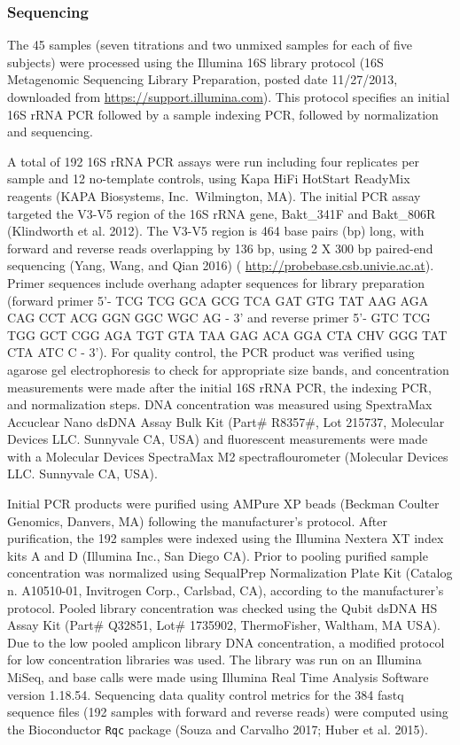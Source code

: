 \documentclass[smallextended]{svjour3}       %
\begin{document}
\hypertarget{sequencing}{%
\subsubsection{Sequencing}\label{sequencing}}

The 45 samples (seven titrations and two unmixed samples for each of
five subjects) were processed using the Illumina 16S library protocol
(16S Metagenomic Sequencing Library Preparation, posted date 11/27/2013,
downloaded from \url{https://support.illumina.com}). This protocol
specifies an initial 16S rRNA PCR followed by a sample indexing PCR,
followed by normalization and sequencing.

A total of 192 16S rRNA PCR assays were run including four replicates
per sample and 12 no-template controls, using Kapa HiFi HotStart
ReadyMix reagents (KAPA Biosystems, Inc.~Wilmington, MA). The initial
PCR assay targeted the V3-V5 region of the 16S rRNA gene, Bakt\_341F and
Bakt\_806R (Klindworth et al. 2012). The V3-V5 region is 464 base pairs
(bp) long, with forward and reverse reads overlapping by 136 bp, using 2
X 300 bp paired-end sequencing (Yang, Wang, and Qian 2016) (
\url{http://probebase.csb.univie.ac.at}). Primer sequences include
overhang adapter sequences for library preparation (forward primer 5'-
TCG TCG GCA GCG TCA GAT GTG TAT AAG AGA CAG CCT ACG GGN GGC WGC AG - 3'
and reverse primer 5'- GTC TCG TGG GCT CGG AGA TGT GTA TAA GAG ACA GGA
CTA CHV GGG TAT CTA ATC C - 3'). For quality control, the PCR product
was verified using agarose gel electrophoresis to check for appropriate
size bands, and concentration measurements were made after the initial
16S rRNA PCR, the indexing PCR, and normalization steps. DNA
concentration was measured using SpextraMax Accuclear Nano dsDNA Assay
Bulk Kit (Part\# R8357\#, Lot 215737, Molecular Devices LLC. Sunnyvale
CA, USA) and fluorescent measurements were made with a Molecular Devices
SpectraMax M2 spectraflourometer (Molecular Devices LLC. Sunnyvale CA,
USA).

Initial PCR products were purified using AMPure XP beads (Beckman
Coulter Genomics, Danvers, MA) following the manufacturer's protocol.
After purification, the 192 samples were indexed using the Illumina
Nextera XT index kits A and D (Illumina Inc., San Diego CA). Prior to
pooling purified sample concentration was normalized using SequalPrep
Normalization Plate Kit (Catalog n. A10510-01, Invitrogen Corp.,
Carlsbad, CA), according to the manufacturer's protocol. Pooled library
concentration was checked using the Qubit dsDNA HS Assay Kit (Part\#
Q32851, Lot\# 1735902, ThermoFisher, Waltham, MA USA). Due to the low
pooled amplicon library DNA concentration, a modified protocol for low
concentration libraries was used. The library was run on an Illumina
MiSeq, and base calls were made using Illumina Real Time Analysis
Software version 1.18.54. Sequencing data quality control metrics for
the 384 fastq sequence files (192 samples with forward and reverse
reads) were computed using the Bioconductor \texttt{Rqc} package (Souza
and Carvalho 2017; Huber et al. 2015).
\end{document}
